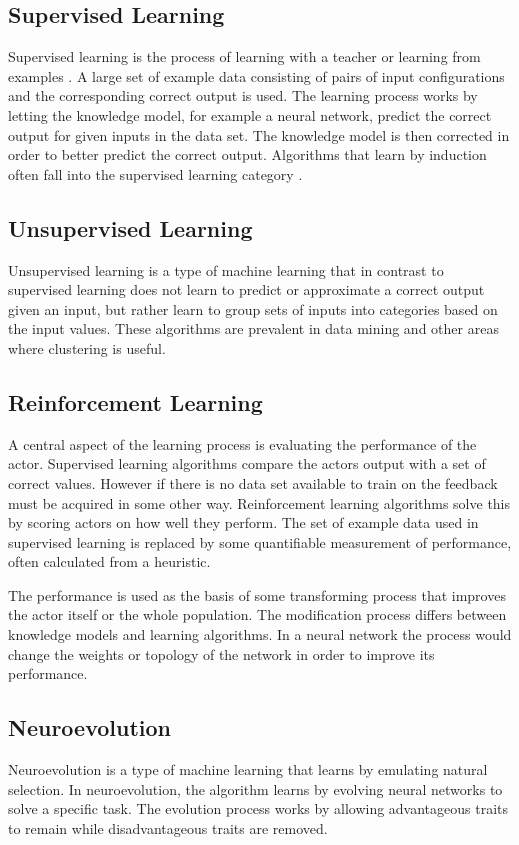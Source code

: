 \subsection{Supervised Learning}
Supervised learning is the process of learning with a teacher or learning from examples \cite{haykin:supervised}. A large set of example data consisting of pairs of input configurations and the corresponding correct output is used. The learning process works by letting the knowledge model, for example a neural network, predict the correct output for given inputs in the data set. The knowledge model is then corrected in order to better predict the correct output. Algorithms that learn by induction often fall into the supervised learning category \cite{glossary}.  

\subsection{Unsupervised Learning}
Unsupervised learning is a type of machine learning that in contrast to supervised learning does not learn to predict or approximate a correct output given an input, but rather learn to group sets of inputs into categories based on the input values. These algorithms are prevalent in data mining and other areas where clustering is useful. 

\subsection{Reinforcement Learning}
A central aspect of the learning process is evaluating the performance of the actor. Supervised learning algorithms compare the actors output with a set of correct values. However if there is no data set available to train on the feedback must be acquired in some other way. Reinforcement learning algorithms solve this by scoring actors on how well they perform. The set of example data used in supervised learning is replaced by some quantifiable measurement of performance, often calculated from a heuristic. 

The performance is used as the basis of some transforming process that improves the actor itself or the whole population. The modification process differs between knowledge models and learning algorithms. In a neural network the process would change the weights or topology of the network in order to improve its performance.

\subsection{Neuroevolution}
Neuroevolution is a type of machine learning that learns by emulating natural selection. In neuroevolution, the algorithm learns by evolving neural networks to solve a specific task. 
The evolution process works by allowing advantageous traits to remain while disadvantageous traits are removed.  

